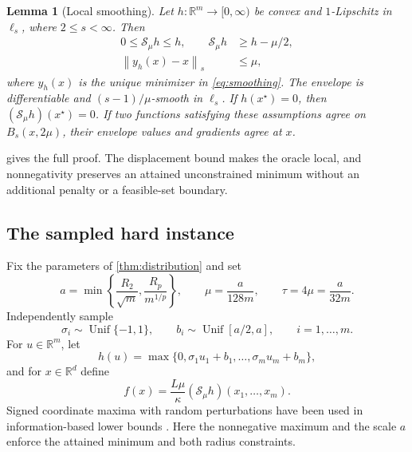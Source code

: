\documentclass[11pt]{article}
\newcommand{\R}{\mathbb{R}}
\newcommand{\cS}{\mathcal{S}}
\newcommand{\norm}[2]{\left\lVert #1\right\rVert_{#2}}
\newtheorem{lemma}[lemma]{Lemma}
\theoremstyle{definition}
\theoremstyle{remark}
\begin{document}
\begin{lemma}[Local smoothing]
\label{lem:smoothing}
Let $h:\R^m\to[0,\infty)$ be convex and $1$-Lipschitz in $\ell_s$,
where $2\le s<\infty$. Then
\begin{align}
 0\le\cS_\mu h\le h,\qquad
 \cS_\mu h&\ge h-\mu/2,
 \label{eq:smoothing-approx}\\
 \norm{y_h(x)-x}{s}&\le\mu,
 \label{eq:smoothing-locality}
\end{align}
where $y_h(x)$ is the unique minimizer in \cref{eq:smoothing}.
The envelope is differentiable and $(s-1)/\mu$-smooth in $\ell_s$.
If $h(x^\star)=0$, then $(\cS_\mu h)(x^\star)=0$.
If two functions satisfying these assumptions agree on
$B_s(x,2\mu)$, their envelope values and gradients agree at $x$.
\end{lemma}

 gives the full proof. The displacement bound makes
the oracle local, and nonnegativity preserves an attained unconstrained
minimum without an additional penalty or a feasible-set boundary.

\subsection{The sampled hard instance}

Fix the parameters of \cref{thm:distribution} and set
\begin{equation}
\label{eq:a-mu-tau}
 a=\min\left\{\frac{R_2}{\sqrt m},\frac{R_p}{m^{1/p}}\right\},
 \qquad\mu=\frac{a}{128m},\qquad\tau=4\mu=\frac{a}{32m}.
\end{equation}
Independently sample
\begin{equation}
\label{eq:latent}
 \sigma_i\sim\operatorname{Unif}\{-1,1\},\qquad
 b_i\sim\operatorname{Unif}[a/2,a],\qquad i=1,\ldots,m.
\end{equation}
For $u\in\R^m$, let
\begin{equation}
\label{eq:hard-max}
 h(u)=\max\{0,\sigma_1u_1+b_1,\ldots,\sigma_mu_m+b_m\},
\end{equation}
and for $x\in\R^d$ define
\begin{equation}
\label{eq:hard-smooth}
 f(x)=\frac{L\mu}{\kappa}(\cS_\mu h)(x_1,\ldots,x_m).
\end{equation}
Signed coordinate maxima with random perturbations have been used in
information-based lower bounds \citep{BraunGuzmanPokutta2017}.
Here the nonnegative maximum and the scale $a$ enforce the attained
minimum and both radius constraints.
\end{document}
